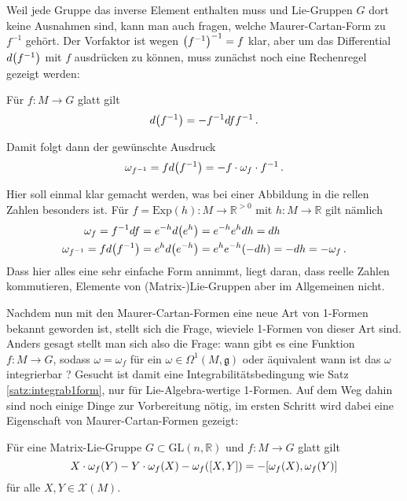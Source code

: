 \documentclass[../H_Analysis_main.tex]{subfiles}
\begin{document}
Weil jede Gruppe das inverse Element enthalten muss und Lie-Gruppen $G$ dort keine Ausnahmen sind, kann man auch fragen, welche Maurer-Cartan-Form zu $f^{-1}$ gehört. Der Vorfaktor ist wegen $\qty(f^{-1})^{-1} = f$ klar, aber um das Differential $d\qty(f^{-1})$ mit $f$ ausdrücken zu können, muss zunächst noch eine Rechenregel gezeigt werden:
\begin{satz}[Quotientenregel]
Für $f: M \rightarrow G$ glatt gilt
\begin{equation}
d\qty(f^{-1}) = -f^{-1} df f^{-1} \, .
\end{equation}
\end{satz}
Damit folgt dann der gewünschte Ausdruck
\begin{equation}
\omega_{f^{-1}} = f d\qty(f^{-1}) = -f \cdot \omega_f \cdot f^{-1} \, .
\end{equation}


\begin{bsp}
Hier soll einmal klar gemacht werden, was bei einer Abbildung in die rellen Zahlen besonders ist. Für $f = \text{Exp}(h): M \rightarrow \mathbb{R}^{> 0}$ mit $h: M \rightarrow \mathbb{R}$ gilt nämlich
\begin{align*}
\omega_f = f^{-1} df &= e^{-h} d\qty(e^h) = e^{-h} e^h dh = dh
\\
\omega_{f^{-1}} = f d\qty(f^{-1}) &= e^h d\qty(e^{-h}) = e^h e^{-h} \qty(-dh) = - dh = - \omega_f \, .
\end{align*}
Dass hier alles eine sehr einfache Form annimmt, liegt daran, dass reelle Zahlen kommutieren, Elemente von (Matrix-)Lie-Gruppen aber im Allgemeinen nicht.
\end{bsp}


Nachdem nun mit den Maurer-Cartan-Formen eine neue Art von 1-Formen bekannt geworden ist, stellt sich die Frage, wieviele 1-Formen von dieser Art sind. Anders gesagt stellt man sich also die Frage: wann gibt es eine Funktion $f: M \rightarrow G$, sodass $\omega = \omega_f$ für ein $\omega \in \Omega^1(M, \mathfrak{g})$ oder äquivalent wann ist das $\omega$ integrierbar ? Gesucht ist damit eine Integrabilitätsbedingung wie Satz \ref{satz:integrab1form}, nur für Lie-Algebra-wertige 1-Formen. Auf dem Weg dahin sind noch einige Dinge zur Vorbereitung nötig, im ersten Schritt wird dabei eine Eigenschaft von Maurer-Cartan-Formen gezeigt:
\begin{satz}
Für eine Matrix-Lie-Gruppe $G \subset \text{GL}(n, \mathbb{R})$ und $f: M \rightarrow G$ glatt gilt
\begin{equation}\label{eq:maurercartangl}
X \cdot \omega_f(Y) - Y \cdot \omega_f(X) - \omega_f\qty([X, Y]) = - \qty[\omega_f(X), \omega_f(Y)]
\end{equation}
für alle $X, Y \in \mathcal{X}(M)$.
\end{satz}
\end{document}
